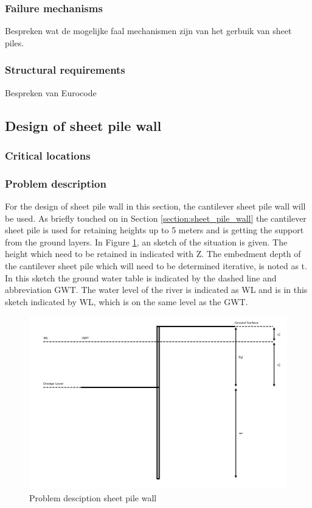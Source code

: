 \subsubsection{Failure mechanisms}

Bespreken wat de mogelijke faal mechanismen zijn van het gerbuik van sheet piles.

\subsubsection{Structural requirements}

Bespreken van Eurocode

\subsection{Design of sheet pile wall}

\subsubsection{Critical locations}



\subsubsection{Problem description}

For the design of sheet pile wall in this section, the cantilever sheet pile wall will be used. As briefly touched on in Section \ref{section:sheet_pile_wall} the cantilever sheet pile is used for retaining heights up to 5 meters and is getting the support from the ground layers. In Figure \ref{fig:problem_description_sheetpiles}, an sketch of the situation is given. The height which need to be retained in indicated with Z. The embedment depth of the cantilever sheet pile which will need to be determined iterative, is noted as t. In this sketch the ground water table is indicated by the dashed line and abbreviation GWT. The water level of the river is indicated as WL and is in this sketch indicated by WL, which is on the same level as the GWT. 

\begin{figure}[H]
    \centering
    \includegraphics[width=0.70\linewidth]{figures/ch8/sketch_profile.png}
    \caption{Problem desciption sheet pile wall}
    \label{fig:problem_description_sheetpiles}
\end{figure}

